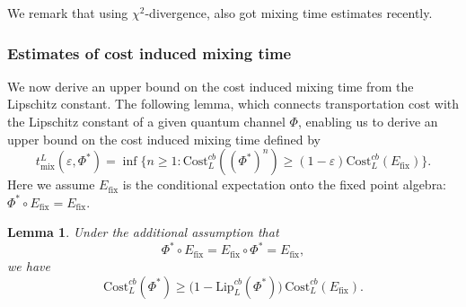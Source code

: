 \documentclass[11pt,reqno]{amsart}
\numberwithin{equation}{section}
\newtheorem{lemma}{Lemma}[section]
\newcommand{\Lip}{\mathrm{Lip}}
\newcommand{\Cost}{\mathrm{Cost}}
\newcommand{\fix}{\mathrm{fix}}
\begin{document}
We remark that using $\chi^2$-divergence, \cite{george2025} also got mixing time estimates recently.
 
\subsubsection{Estimates of cost induced mixing time}
We now derive an upper bound on the cost induced mixing time from the Lipschitz constant. The following lemma, which connects transportation cost with the Lipschitz constant of a given quantum channel $\Phi$, enabling us to derive an upper bound on the cost induced mixing time defined by
\begin{equation}\label{def:L induced mixing time}
    t_{\mathrm{mix}}^L(\varepsilon,\Phi^*)= \inf\{n \ge 1: \Cost_L^{cb}((\Phi^*)^n)\ge (1-\varepsilon) \Cost_L^{cb}(E_\fix)\}. 
\end{equation}
Here we assume $E_{\fix}$ is the conditional expectation onto the fixed point algebra: $\Phi^* \circ E_\fix = E_\fix$. 
\begin{lemma}\label{lemma:connection 1}
Under the additional assumption that
\[
\Phi^* \circ E_{\fix} = E_{\fix} \circ \Phi^* = E_{\fix},
\]
we have
\[
\Cost_L^{cb}(\Phi^*) \ge \bigl(1 - \Lip_L^{cb}(\Phi^*)\bigr)\, \Cost_L^{cb}(E_\fix).
\]
\end{lemma}
\end{document}
